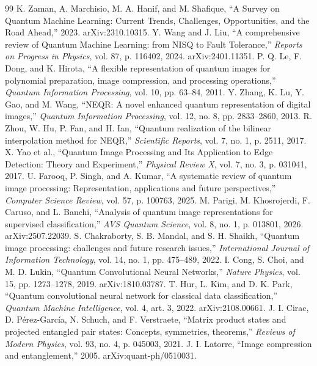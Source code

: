 \documentclass[11pt]{article}
\begin{document}
\begin{thebibliography}{99}
 K. Zaman, A. Marchisio, M. A. Hanif, and M. Shafique, ``A Survey on Quantum Machine Learning: Current Trends, Challenges, Opportunities, and the Road Ahead,'' 2023. arXiv:2310.10315.
 Y. Wang and J. Liu, ``A comprehensive review of Quantum Machine Learning: from NISQ to Fault Tolerance,'' \textit{Reports on Progress in Physics}, vol. 87, p. 116402, 2024. arXiv:2401.11351.
 P. Q. Le, F. Dong, and K. Hirota, ``A flexible representation of quantum images for polynomial preparation, image compression, and processing operations,'' \textit{Quantum Information Processing}, vol. 10, pp. 63--84, 2011.
 Y. Zhang, K. Lu, Y. Gao, and M. Wang, ``NEQR: A novel enhanced quantum representation of digital images,'' \textit{Quantum Information Processing}, vol. 12, no. 8, pp. 2833--2860, 2013.
 R. Zhou, W. Hu, P. Fan, and H. Ian, ``Quantum realization of the bilinear interpolation method for NEQR,'' \textit{Scientific Reports}, vol. 7, no. 1, p. 2511, 2017.
 X. Yao et al., ``Quantum Image Processing and Its Application to Edge Detection: Theory and Experiment,'' \textit{Physical Review X}, vol. 7, no. 3, p. 031041, 2017.
 U. Farooq, P. Singh, and A. Kumar, ``A systematic review of quantum image processing: Representation, applications and future perspectives,'' \textit{Computer Science Review}, vol. 57, p. 100763, 2025.
 M. Parigi, M. Khosrojerdi, F. Caruso, and L. Banchi, ``Analysis of quantum image representations for supervised classification,'' \textit{AVS Quantum Science}, vol. 8, no. 1, p. 013801, 2026. arXiv:2507.22039.
 S. Chakraborty, S. B. Mandal, and S. H. Shaikh, ``Quantum image processing: challenges and future research issues,'' \textit{International Journal of Information Technology}, vol. 14, no. 1, pp. 475--489, 2022.
 I. Cong, S. Choi, and M. D. Lukin, ``Quantum Convolutional Neural Networks,'' \textit{Nature Physics}, vol. 15, pp. 1273--1278, 2019. arXiv:1810.03787.
 T. Hur, L. Kim, and D. K. Park, ``Quantum convolutional neural network for classical data classification,'' \textit{Quantum Machine Intelligence}, vol. 4, art. 3, 2022. arXiv:2108.00661.
 J. I. Cirac, D. P\'erez-Garc\'ia, N. Schuch, and F. Verstraete, ``Matrix product states and projected entangled pair states: Concepts, symmetries, theorems,'' \textit{Reviews of Modern Physics}, vol. 93, no. 4, p. 045003, 2021.
 J. I. Latorre, ``Image compression and entanglement,'' 2005. arXiv:quant-ph/0510031.

\end{thebibliography}
\end{document}
